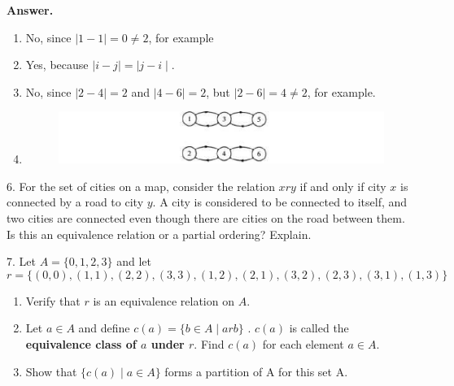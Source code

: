 \documentclass[10pt,]{book}
\newcommand{\terminology}[1]{\textbf{#1}}
\theoremstyle{plain}
\theoremstyle{definition}
\theoremstyle{definition}
\theoremstyle{definition}
\theoremstyle{definition}
\begin{document}
\begin{exercisegroup}
\begin{enumerate}[label=\alph*]
\end{enumerate}
%
\par\smallskip
\par\smallskip
\noindent\textbf{Answer.}\hypertarget{answer-9}{}\quad
\leavevmode%
\begin{enumerate}[label=\alph*]
\item\hypertarget{li-56}{} No, since \(\mid 1-1\mid =0\neq 2\), for example%
\item\hypertarget{li-57}{} Yes, because \(\mid i-j\mid =\)\(\mid j-i\mid \).%
\item\hypertarget{li-58}{} No, since \(\mid 2-4\mid =2\) and \(\mid 4-6\mid =2\), but \(\mid 2-6\mid =4\neq 2\), for example.%
\item\hypertarget{li-59}{}\leavevmode%
\begin{figure}
\centering
\includegraphics[width=1\linewidth]{images/fig-sol-6-3-5.png}
\end{figure}
%
\end{enumerate}
%
\item[6.]\hypertarget{exercise-18}{}For the set of cities on a map, consider the relation \(x r y\) if and only if city \(x\) is connected by a road to city \(y\). A city is considered to be connected to itself, and two cities are connected even though there are cities on the road between them. Is this an equivalence
relation or a partial ordering? Explain.%
\par\smallskip
\item[7.]\hypertarget{exercise-19}{} Let \(A = \{0, 1, 2, 3\}\) and let
\[r = \{(0, 0), (1, 1), (2, 2), (3, 3), (1, 2),(2, 1), (3, 2), (2, 3), (3, 1), (1, 3)\}\]%
\par
\leavevmode%
\begin{enumerate}[label=\alph*]
\item\hypertarget{li-60}{}Verify that \(r\) is an equivalence relation on \(A\).%
\item\hypertarget{li-61}{}Let \(a \in A\) and define \(c(a) = \{b \in A \mid a r b\}\)\label{notation-5}
. \(c(a)\) is called the \terminology{equivalence class of \(a\) under \(r\)}. Find \(c(a)\) for each element \(a \in A\).%
\item\hypertarget{li-62}{}Show that \(\{c(a) \mid  a \in A\}\) forms a partition of A for this set A.%

\end{enumerate}
\end{exercisegroup}
\end{document}
